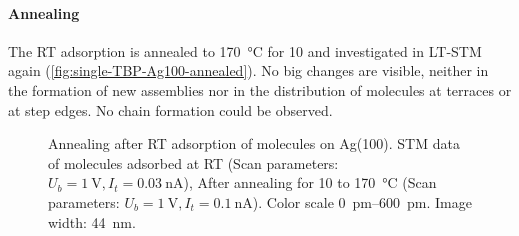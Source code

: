 	\paragraph{Annealing}
	The RT adsorption is annealed to \SI{170}{\celsius} for \SI{10}{\min} and investigated in LT-STM again (\autoref{fig:single-TBP-Ag100-annealed}). No big changes are visible, neither in the formation of new assemblies nor in the distribution of molecules at terraces or at step edges. No chain formation could be observed.
	
	\begin{figure}[] \centering
		\caption{Annealing after RT adsorption of molecules on Ag(100).  STM data of molecules adsorbed at RT (Scan parameters: $U_b=\SI{1}{\volt}, I_t=\SI{0,03}{\nano \ampere}$),  After annealing for \SI{10}{\min} to \SI{170}{\celsius} (Scan parameters: $U_b=\SI{1}{\volt}, I_t=\SI{0,1}{\nano \ampere}$). Color scale \SIrange{0}{600}{\pico\meter}. Image width: \SI{44}{\nm}.}
		\label{fig:single-TBP-Ag100-annealing}
	\end{figure}
	
